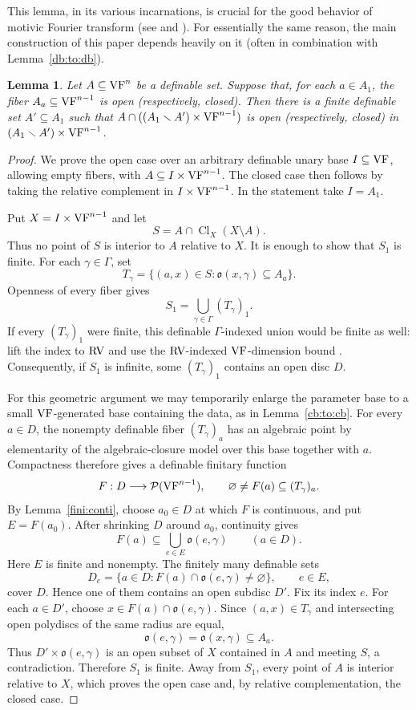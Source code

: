 \documentclass[12pt]{amsart}
\theoremstyle{plain}
\newtheorem{lem}[thm]{Lemma}
\theoremstyle{definition}
\theoremstyle{remark}
\numberwithin{equation}{section}
\theoremstyle{plain}
\newcommand{\VF}{\textup{VF}}
\newcommand{\RV}{\textup{RV}}
\newcommand{\go}{\mathfrak{o}}
\newcommand{\0}{\emptyset}
\newcommand{\mdl}[1]{\mathcal{#1}}  %
\newcommand{\fun}{\longrightarrow}
\newcommand{\sub}{\subseteq}
\newcommand{\mi}{\smallsetminus}
\DeclareMathOperator{\Cl}{Cl}
\begin{document}
This lemma, in its various incarnations, is crucial for the good behavior of motivic Fourier transform (see \cite[\S~11]{hrushovski:kazhdan:integration:vf} and \cite{yin:hk:part:3}). For essentially the same reason, the  main construction of this paper depends heavily on  it (often in combination with Lemma~\ref{db:to:db}).


\begin{lem}\label{lem:open:fiberwise}
Let $A\subseteq \VF^n$ be a definable set. Suppose that, for each $a \in A_1$, the fiber $A_a \sub \VF^{n-1}$ is open (respectively, closed). Then there is a finite definable set $A' \subseteq A_1$ such that $A\cap ((A_1 \mi A')\times \VF^{n-1})$ is open (respectively, closed) in $(A_1 \mi A')\times \VF^{n-1}$.
\end{lem}
\begin{proof}
We prove the open case over an arbitrary definable unary base $I\subseteq\VF$, allowing empty fibers, with $A\subseteq I\times\VF^{n-1}$. The closed case then follows by taking the relative complement in $I\times\VF^{n-1}$. In the statement take $I=A_1$.

Put $X=I\times\VF^{n-1}$ and let
\[
S=A\cap\Cl_X(X\setminus A).
\]
Thus no point of $S$ is interior to $A$ relative to $X$. It is enough to show that $S_1$ is finite. For each $\gamma\in\Gamma$, set
\[
T_\gamma=\{(a,x)\in S:\go(x,\gamma)\subseteq A_a\}.
\]
Openness of every fiber gives
\[
S_1=\bigcup_{\gamma\in\Gamma}(T_\gamma)_1.
\]
If every $(T_\gamma)_1$ were finite, this definable $\Gamma$-indexed union would be finite as well: lift the index to $\RV$ and use the $\RV$-indexed $\VF$-dimension bound \cite[Lemma~4.3]{Yin:special:trans}. Consequently, if $S_1$ is infinite, some $(T_\gamma)_1$ contains an open disc $D$.

For this geometric argument we may temporarily enlarge the parameter base to a small $\VF$-generated base containing the data, as in Lemma~\ref{cb:to:cb}. For every $a\in D$, the nonempty definable fiber $(T_\gamma)_a$ has an algebraic point by elementarity of the algebraic-closure model over this base together with $a$. Compactness therefore gives a definable finitary function
\[
F:D\fun\mdl P(\VF^{n-1}),\qquad
\varnothing\ne F(a)\subseteq(T_\gamma)_a.
\]
By Lemma~\ref{fini:conti}, choose $a_0\in D$ at which $F$ is continuous, and put $E=F(a_0)$. After shrinking $D$ around $a_0$, continuity gives
\[
F(a)\subseteq\bigcup_{e\in E}\go(e,\gamma)\qquad(a\in D).
\]
Here $E$ is finite and nonempty. The finitely many definable sets
\[
D_e=\{a\in D:F(a)\cap\go(e,\gamma)\ne\varnothing\},\qquad e\in E,
\]
cover $D$. Hence one of them contains an open subdisc $D'$. Fix its index $e$. For each $a\in D'$, choose $x\in F(a)\cap\go(e,\gamma)$. Since $(a,x)\in T_\gamma$ and intersecting open polydiscs of the same radius are equal,
\[
\go(e,\gamma)=\go(x,\gamma)\subseteq A_a.
\]
Thus $D'\times\go(e,\gamma)$ is an open subset of $X$ contained in $A$ and meeting $S$, a contradiction. Therefore $S_1$ is finite. Away from $S_1$, every point of $A$ is interior relative to $X$, which proves the open case and, by relative complementation, the closed case.
\end{proof}
\end{document}
